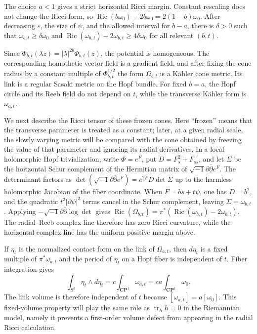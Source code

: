 \documentclass[11pt]{amsart}
\theoremstyle{definition}
\theoremstyle{remark}
\begin{document}
The choice $a<1$ gives a strict horizontal Ricci margin.  Constant rescaling does not change the Ricci form, so $\operatorname{Ric}(b\omega_0)-2b\omega_0=2(1-b)\omega_0$.  After decreasing $\varepsilon$, the size of $\psi$, and the allowed interval for $b-a$, there is $\delta>0$ such that $\omega_{b,t}\geq\delta\omega_0$ and $\operatorname{Ric}(\omega_{b,t})-2\omega_{b,t}\geq4\delta\omega_0$ for all relevant $(b,t)$.

Since $\Phi_{b,t}(\lambda z)=|\lambda|^{2b}\Phi_{b,t}(z)$, the potential is homogeneous.  The corresponding homothetic vector field is a gradient field, and after fixing the cone radius by a constant multiple of $\Phi_{b,t}^{1/2}$ the form $\Omega_{b,t}$ is a K\"ahler cone metric.  Its link is a regular Sasaki metric on the Hopf bundle.  For fixed $b=a$, the Hopf circle and its Reeb field do not depend on $t$, while the transverse K\"ahler form is $\omega_{a,t}$.

We next describe the Ricci tensor of these frozen cones.  Here ``frozen'' means that the transverse parameter is treated as a constant; later, at a given radial scale, the slowly varying metric will be compared with the cone obtained by freezing the value of that parameter and ignoring its radial derivatives.  In a local holomorphic Hopf trivialization, write $\Phi=e^F$, put $D=F_s^2+F_{ss}$, and let $\Sigma$ be the horizontal Schur complement of the Hermitian matrix of $\sqrt{-1}\partial\bar\partial e^F$.  The determinant factors as $\det(\sqrt{-1}\partial\bar\partial e^F)=e^{2F}D\det\Sigma$ up to the harmless holomorphic Jacobian of the fiber coordinate.  When $F=bs+t\psi$, one has $D=b^2$, and the quadratic $t^2|\partial\psi|^2$ terms cancel in the Schur complement, leaving $\Sigma=\omega_{b,t}$.  Applying $-\sqrt{-1}\partial\bar\partial\log\det$ gives $\operatorname{Ric}(\Omega_{b,t})=\pi^*(\operatorname{Ric}(\omega_{b,t})-2\omega_{b,t})$.  The radial--Reeb complex line therefore has zero Ricci curvature, while the horizontal complex line has the uniform positive margin above.

If $\eta_t$ is the normalized contact form on the link of $\Omega_{a,t}$, then $d\eta_t$ is a fixed multiple of $\pi^*\omega_{a,t}$ and the period of $\eta_t$ on a Hopf fiber is independent of $t$.  Fiber integration gives
\begin{equation}\label{eq:appendix-contact-volume}
\int_{S^3}\eta_t\wedge d\eta_t
 =c\int_{\mathbf{CP}^1}\omega_{a,t}
 =ca\int_{\mathbf{CP}^1}\omega_0.
\end{equation}
The link volume is therefore independent of $t$ because $[\omega_{a,t}]=a[\omega_0]$.  This fixed-volume property will play the same role as $\operatorname{tr}_h\dot h=0$ in the Riemannian model, namely it prevents a first-order volume defect from appearing in the radial Ricci calculation.
\end{document}
